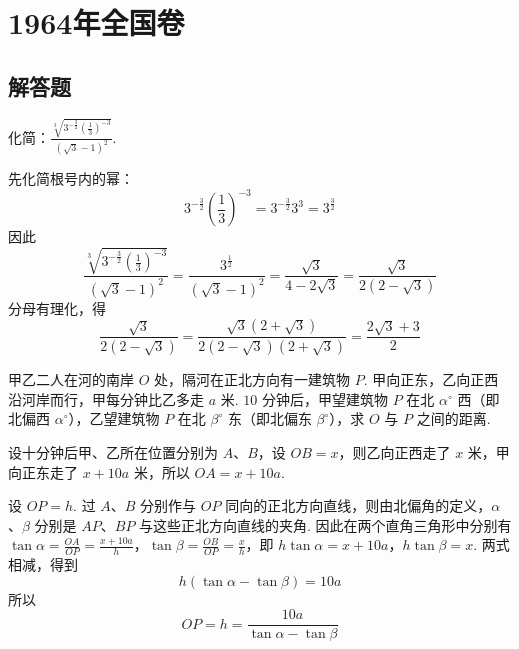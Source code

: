 \documentclass[UTF8,a4paper,oneside,11pt]{ctexbook}
\begin{document}
\mainmatter


\chapter{1964年全国卷}

\section{解答题}

\begin{problem}
化简：\(\frac{\sqrt[3]{3^{-\frac32}\left( \frac13 \right)^{-3}}}{\left( \sqrt3-1 \right)^2}\).
\end{problem}

\begin{solution}
先化简根号内的幂：
\[
3^{-\frac32}\left( \frac13 \right)^{-3}=3^{-\frac32}3^3=3^{\frac32}
\]
因此
\[
\frac{\sqrt[3]{3^{-\frac32}\left( \frac13 \right)^{-3}}}{\left( \sqrt3-1 \right)^2}
=\frac{3^{\frac12}}{\left( \sqrt3-1 \right)^2}
=\frac{\sqrt3}{4-2\sqrt3}
=\frac{\sqrt3}{2\left( 2-\sqrt3 \right)}
\]
分母有理化，得
\[
\frac{\sqrt3}{2\left( 2-\sqrt3 \right)}
=\frac{\sqrt3\left( 2+\sqrt3 \right)}{2\left( 2-\sqrt3 \right)\left( 2+\sqrt3 \right)}
=\frac{2\sqrt3+3}{2}
\]
\end{solution}

\begin{problem}
甲乙二人在河的南岸 \(O\) 处，隔河在正北方向有一建筑物 \(P\). 甲向正东，乙向正西沿河岸而行，甲每分钟比乙多走 \(a\text{ 米}\). \(10\) 分钟后，甲望建筑物 \(P\) 在北 \(\alpha^\circ\) 西（即北偏西 \(\alpha^\circ\)），乙望建筑物 \(P\) 在北 \(\beta^\circ\) 东（即北偏东 \(\beta^\circ\)），求 \(O\) 与 \(P\) 之间的距离.
\end{problem}

\begin{solution}
设十分钟后甲、乙所在位置分别为 \(A\)、\(B\)，设 \(OB=x\)，则乙向正西走了 \(x\) 米，甲向正东走了 \(x+10a\) 米，所以 \(OA=x+10a\).


设 \(OP=h\). 过 \(A\)、\(B\) 分别作与 \(OP\) 同向的正北方向直线，则由北偏角的定义，\(\alpha\)、\(\beta\) 分别是 \(AP\)、\(BP\) 与这些正北方向直线的夹角. 因此在两个直角三角形中分别有
\(\tan\alpha=\frac{OA}{OP}=\frac{x+10a}{h}\)，\(\tan\beta=\frac{OB}{OP}=\frac{x}{h}\)，即 \(h\tan\alpha=x+10a\)，\(h\tan\beta=x\).
两式相减，得到
\[
h\left( \tan\alpha-\tan\beta \right)=10a
\]
所以
\[
OP=h=\frac{10a}{\tan\alpha-\tan\beta}
\]
\end{solution}
\end{document}

